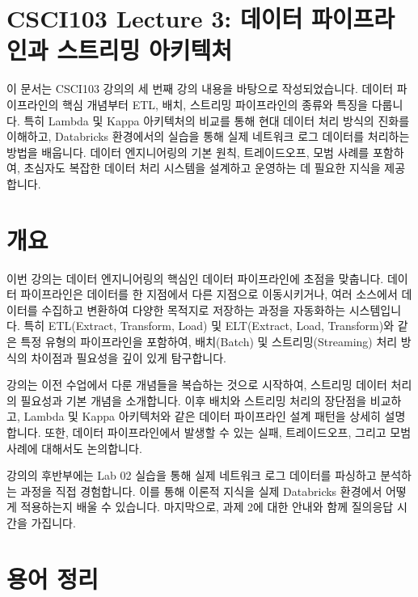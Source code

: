 \documentclass[11pt,a4paper]{article}
\begin{document}
\section*{\centering CSCI103 Lecture 3: 데이터 파이프라인과 스트리밍 아키텍처}

\begin{tcolorbox}[summarybox]
이 문서는 CSCI103 강의의 세 번째 강의 내용을 바탕으로 작성되었습니다.
데이터 파이프라인의 핵심 개념부터 ETL, 배치, 스트리밍 파이프라인의 종류와 특징을 다룹니다.
특히 Lambda 및 Kappa 아키텍처의 비교를 통해 현대 데이터 처리 방식의 진화를 이해하고,
Databricks 환경에서의 실습을 통해 실제 네트워크 로그 데이터를 처리하는 방법을 배웁니다.
데이터 엔지니어링의 기본 원칙, 트레이드오프, 모범 사례를 포함하여,
초심자도 복잡한 데이터 처리 시스템을 설계하고 운영하는 데 필요한 지식을 제공합니다.
\end{tcolorbox}

\newpage
\section{개요}

이번 강의는 데이터 엔지니어링의 핵심인 데이터 파이프라인에 초점을 맞춥니다.
데이터 파이프라인은 데이터를 한 지점에서 다른 지점으로 이동시키거나,
여러 소스에서 데이터를 수집하고 변환하여 다양한 목적지로 저장하는 과정을 자동화하는 시스템입니다.
특히 ETL(Extract, Transform, Load) 및 ELT(Extract, Load, Transform)와 같은 특정 유형의 파이프라인을 포함하여,
배치(Batch) 및 스트리밍(Streaming) 처리 방식의 차이점과 필요성을 깊이 있게 탐구합니다.

강의는 이전 수업에서 다룬 개념들을 복습하는 것으로 시작하여,
스트리밍 데이터 처리의 필요성과 기본 개념을 소개합니다.
이후 배치와 스트리밍 처리의 장단점을 비교하고,
Lambda 및 Kappa 아키텍처와 같은 데이터 파이프라인 설계 패턴을 상세히 설명합니다.
또한, 데이터 파이프라인에서 발생할 수 있는 실패, 트레이드오프, 그리고 모범 사례에 대해서도 논의합니다.

강의의 후반부에는 Lab 02 실습을 통해 실제 네트워크 로그 데이터를 파싱하고 분석하는 과정을 직접 경험합니다.
이를 통해 이론적 지식을 실제 Databricks 환경에서 어떻게 적용하는지 배울 수 있습니다.
마지막으로, 과제 2에 대한 안내와 함께 질의응답 시간을 가집니다.

\newpage
\section{용어 정리}
\end{document}
